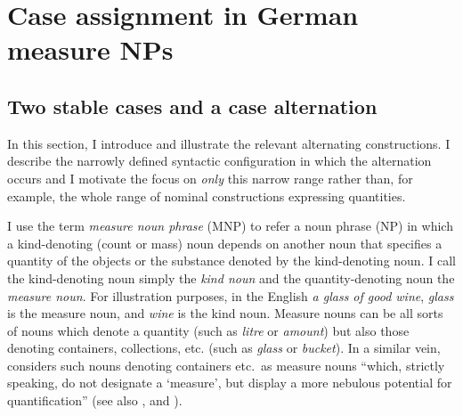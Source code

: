 \documentclass[USenglish]{article}
\begin{document}


\section{Case assignment in German measure NPs}
\label{sec:germanmeasurenps}


\subsection{Two stable cases and a case alternation}
\label{sec:descriptive}

In this section, I introduce and illustrate the relevant alternating constructions.
I describe the narrowly defined syntactic configuration in which the alternation occurs and I motivate the focus on \textit{only} this narrow range rather than, for example, the whole range of nominal constructions expressing quantities.

I use the term \textit{measure noun phrase} (MNP) to refer a noun phrase (NP) in which a kind-denoting (count or mass) noun depends on another noun that specifies a quantity of the objects or the substance denoted by the kind-denoting noun.
I call the kind-denoting noun simply the \textit{kind noun} and the quantity-denoting noun the \textit{measure noun}.
For illustration purposes, in the English \textit{a glass of good wine}, \textit{glass} is the measure noun, and \textit{wine} is the kind noun.
Measure nouns can be all sorts of nouns which denote a quantity (such as \textit{litre} or \textit{amount}) but also those denoting containers, collections, etc. (such as \textit{glass} or \textit{bucket}).
In a similar vein, \citet[284]{Brems2003} considers such nouns denoting containers etc.\ as measure nouns ``which, strictly speaking, do not designate a `measure', but display a more nebulous potential for quantification'' (see also \citealp[530]{Koptjevskaja2001}, and \citealp[338]{Rutkowski2007}).
\end{document}

